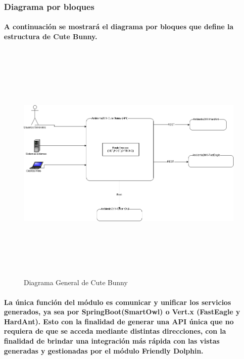       \begin{landscape}
        \subsubsection{Diagrama por bloques}
        \paragraph{A continuación se mostrará el diagrama por bloques que define la estructura de Cute Bunny.}
          \begin{figure}[b!]
          \centering
          \includegraphics[width=22.5cm,height=12cm]{./images/DiagramaCuteBunny.png}
          \caption{Diagrama General de Cute Bunny}
        \end{figure}
      \end{landscape}
  \paragraph{La única función del módulo es comunicar y unificar los servicios generados, ya sea por SpringBoot(SmartOwl) o Vert.x (FastEagle y HardAnt). Esto con la finalidad de generar una API única que no requiera de que se acceda mediante distintas direcciones, con la finalidad de brindar una integración más rápida con las vistas generadas y gestionadas por el módulo Friendly Dolphin.}